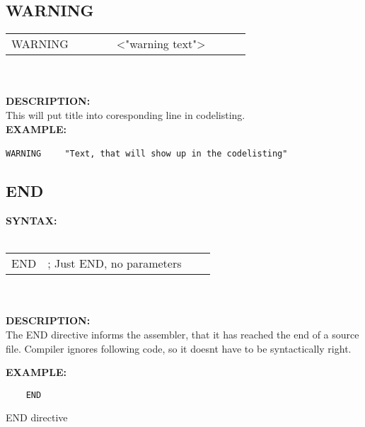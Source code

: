 {                \subsection{WARNING}
                 {
                    \texttt{}
                    \begin{tabular}[h!]{llll}
                        { \color{highlight_directive} WARNING }\verb`       `{ \color{highlight_string} <"warning text"> }
                    \end{tabular}
                    }\\
                    \\
                \textbf{DESCRIPTION:}\\
                This will put title into coresponding line in codelisting.  \\
                \textbf{EXAMPLE:}\\
                        \begin{code}[h!]
                            {\color{highlight_directive}\verb'WARNING'}\verb'    '
                            {\color{highlight_constant}\verb'"Text, that will show up in the codelisting"'}
                        \end{code}

                \subsection{END}
                \textbf{SYNTAX:}\\
                \\ {
                        \texttt{}
                        \begin{tabular}[h!]{llll}
                                { \color{highlight_directive} END } &
                               { \color{highlight_comment} ; Just END, no parameters }\\
                        \end{tabular}
                    }\\
                    \\
                \textbf{DESCRIPTION:}\\
                The END directive informs the assembler, that it has reached the end of a source file. Compiler ignores following code, so it doesnt have to be
                syntactically right.

                \textbf{EXAMPLE:}\\
                    \begin{code}[h!]
                        \verb'    '{\color{highlight_directive}\verb'END'}
                        \caption{END directive}
                    \end{code}

}
